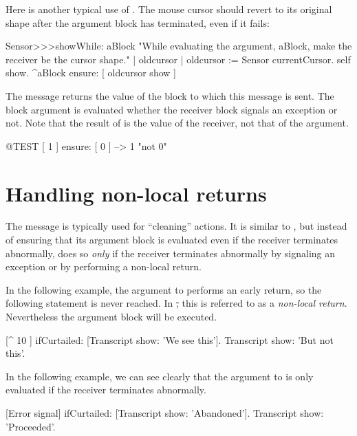 \documentclass[a4paper,10pt,twoside]{book}
\begin{document}
Here is another typical use of .
The mouse cursor should revert to its original shape after the argument block has terminated, even if it fails:


\begin{code}{}
Sensor>>>showWhile: aBlock 
	"While evaluating the argument, aBlock,
	make the receiver be the cursor shape."
	| oldcursor |
	oldcursor := Sensor currentCursor.
	self show.
	^aBlock ensure: [ oldcursor show ]
\end{code}

The message  returns the value of the block to which this message is sent. The block argument is evaluated whether the receiver block signals an exception or not. Note that the result of  is the value of the receiver, not that of the argument.

\begin{code}{@TEST}
[ 1 ] ensure: [ 0 ] --> 1    "not 0"
\end{code}

\section{Handling non-local returns}

The message  is typically used for ``cleaning'' actions. It is similar to , but instead of ensuring that its argument block is evaluated even if the receiver terminates abnormally,  does so \emph{only} if the receiver terminates abnormally by signaling an exception or by performing a non-local return.

In the following example, the argument to  performs an early return, so the following statement is never reached.
In \st, this is referred to as a \emph{non-local return}.
Nevertheless the argument block will be executed.
\begin{code}{}
[^ 10 ] ifCurtailed: [Transcript show: 'We see this'].
Transcript show: 'But not this'.
\end{code}

In the following example, we can see clearly that the argument to  is only evaluated if the receiver terminates abnormally.
\begin{code}{}
[Error signal] ifCurtailed: [Transcript show: 'Abandoned'].
Transcript show: 'Proceeded'.
\end{code}
\end{document}
